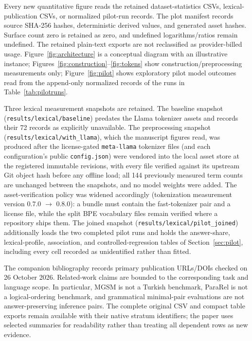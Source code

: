 Every new quantitative figure reads the retained dataset-statistics CSVs, lexical-publication CSVs, or
normalized pilot-run records. The plot manifest records source SHA-256 hashes, deterministic derived
values, and generated asset hashes. Surface count zero is retained as zero, and undefined
logarithms/ratios remain undefined. The retained plain-text exports are not reclassified as
provider-billed usage. Figure~\ref{fig:architecture} is a conceptual diagram with an illustrative instance;
Figures~\ref{fig:construction}--\ref{fig:tokens} show construction/preprocessing measurements only;
Figure~\ref{fig:pilot} shows exploratory pilot model outcomes read from the append-only normalized records
of the runs in Table~\ref{tab:pilotruns}.

Three lexical measurement snapshots are retained. The baseline snapshot
(\texttt{results/lexical/baseline}) predates the Llama tokenizer assets and records their 72 records as
explicitly unavailable. The preprocessing snapshot (\texttt{results/lexical/with\_llama}), which the
manuscript figures read, was produced after the license-gated \texttt{meta-llama} tokenizer files (and each
configuration's public \texttt{config.json}) were vendored into the local asset store at the registered
immutable revisions, with every file verified against its upstream Git object hash before any offline load;
all 144 previously measured term counts are unchanged between the snapshots, and no model weights were
added. The asset-verification policy was widened accordingly (tokenization measurement version 0.7.0 $\to$
0.8.0): a bundle must contain the fast-tokenizer pair and a license file, while the split BPE vocabulary
files remain verified where a repository ships them. The joined snapshot
(\texttt{results/lexical/pilot\_joined}) additionally loads the two completed pilot runs and holds the
answer-share, lexical-profile, association, and controlled-regression tables of
Section~\ref{sec:pilot}, including every cell recorded as unidentified rather than fitted.

The companion bibliography records primary publication URLs/DOIs checked on 26 October 2026. Related-work
claims are bounded to the corresponding task and language scope. In particular, MGSM is not a Turkish
benchmark, ParaRel is not a logical-ordering benchmark, and grammatical minimal-pair evaluations are not
answer-preserving inference pairs. The complete original CSV and compact table exports remain available with
their native stratum identifiers; the paper uses selected summaries for readability rather than treating all
dependent rows as new evidence.

